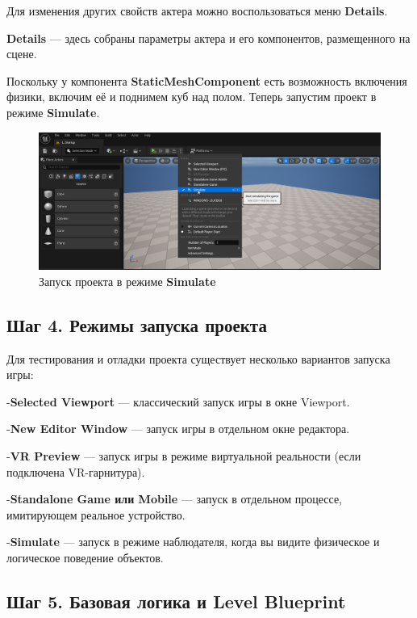 Для изменения других свойств актера можно воспользоваться меню \textbf{Details}.

\textbf{Details} — здесь собраны параметры актера и его компонентов, размещенного на сцене.

Поскольку у компонента \textbf{StaticMeshComponent} есть возможность включения физики, включим её и поднимем куб над полом. Теперь запустим проект в режиме \textbf{Simulate}.

\begin{figure}[h]
    \centering
    \includegraphics[width=\textwidth]{Lections/StartInSimilate.png}
    \caption{Запуск проекта в режиме \textbf{Simulate}}
\end{figure}

\subsection{Шаг 4. Режимы запуска проекта}

Для тестирования и отладки проекта существует несколько вариантов запуска игры:

-\hspace{1em}\textbf{Selected Viewport} — классический запуск игры в окне Viewport.

-\hspace{1em}\textbf{New Editor Window} — запуск игры в отдельном окне редактора. 

-\hspace{1em}\textbf{VR Preview} — запуск игры в режиме виртуальной реальности (если подключена VR-гарнитура).

-\hspace{1em}\textbf{Standalone Game или Mobile} — запуск в отдельном процессе, имитирующем реальное устройство.

-\hspace{1em}\textbf{Simulate} — запуск в режиме наблюдателя, когда вы видите физическое и логическое поведение объектов.

\subsection{Шаг 5. Базовая логика и Level Blueprint}

